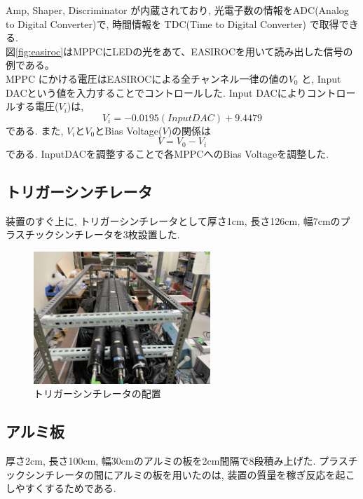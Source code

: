 Amp, Shaper, Discriminator が内蔵されており, 光電子数の情報をADC(Analog to Digital Converter)で, 時間情報を TDC(Time to Digital Converter) で取得できる.
\\
図\ref{fig:easiroc}はMPPCにLEDの光をあて、EASIROCを用いて読み出した信号の例である。
\\
MPPC にかける電圧はEASIROCによる全チャンネル一律の値の$V_0$ と, Input DACという値を入力することでコントロールした.
Input DACによりコントロールする電圧($V_i$)は, 
\begin{equation}
    V_i = -0.0195(InputDAC) + 9.4479
\end{equation}
である.
また, $V_i$と$V_0$とBias Voltage($V$)の関係は
\begin{equation}
    V = V_0 - V_i
\end{equation}
である.
InputDACを調整することで各MPPCへのBias Voltageを調整した.

\subsection{トリガーシンチレータ}
装置のすぐ上に, トリガーシンチレータとして厚さ1cm, 長さ126cm, 幅7cmのプラスチックシンチレータを3枚設置した.
\begin{figure}[H]
    \centering
    \includegraphics[height=5cm]{img/Trigger.jpeg}
    \caption{トリガーシンチレータの配置}
    \label{fig:trigger}
\end{figure}

\subsection{アルミ板}
厚さ2cm, 長さ100cm, 幅30cmのアルミの板を2cm間隔で8段積み上げた.
プラスチックシンチレータの間にアルミの板を用いたのは, 装置の質量を稼ぎ反応を起こしやすくするためである.


